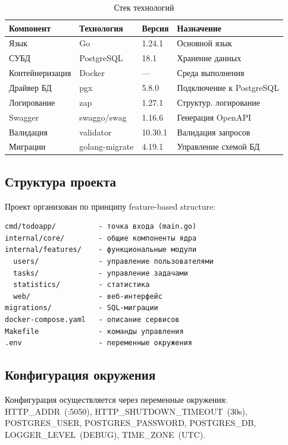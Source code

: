 \documentclass[a4paper,14pt]{extarticle}
\begin{document}
\begin{table}[H]
\caption{Стек технологий}\label{tab:stack}
\centering
\small
\begin{tabularx}{\textwidth}{|X|l|l|X|}
\hline
\textbf{Компонент} & \textbf{Технология} & \textbf{Версия} & \textbf{Назначение} \\
\hline
Язык & Go & 1.24.1 & Основной язык \\
\hline
СУБД & PostgreSQL & 18.1 & Хранение данных \\
\hline
Контейнеризация & Docker & --- & Среда выполнения \\
\hline
Драйвер БД & pgx & 5.8.0 & Подключение к PostgreSQL \\
\hline
Логирование & zap & 1.27.1 & Структур. логирование \\
\hline
Swagger & swaggo/swag & 1.16.6 & Генерация OpenAPI \\
\hline
Валидация & validator & 10.30.1 & Валидация запросов \\
\hline
Миграции & golang-migrate & 4.19.1 & Управление схемой БД \\
\hline
\end{tabularx}
\end{table}

\subsection{Структура проекта}

Проект организован по принципу feature-based structure:

\begin{lstlisting}
cmd/todoapp/          - точка входа (main.go)
internal/core/        - общие компоненты ядра
internal/features/    - функциональные модули
  users/              - управление пользователями
  tasks/              - управление задачами
  statistics/         - статистика
  web/                - веб-интерфейс
migrations/           - SQL-миграции
docker-compose.yaml   - описание сервисов
Makefile              - команды управления
.env                  - переменные окружения
\end{lstlisting}

\subsection{Конфигурация окружения}

Конфигурация осуществляется через переменные окружения: HTTP\_ADDR~(:5050), HTTP\_SHUTDOWN\_TIMEOUT~(30s), POSTGRES\_USER, POSTGRES\_PASSWORD, POSTGRES\_DB, LOGGER\_LEVEL~(DEBUG), TIME\_ZONE~(UTC).
\end{document}
